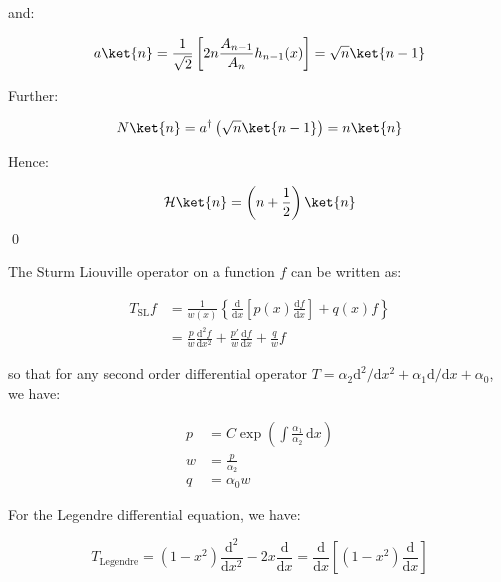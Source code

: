 \documentclass[12pt]{article}
\begin{document}
and:

\begin{equation}
    a \ket{n} = \frac{1}{\sqrt{2}} \left[ 2n \frac{A_{n-1}}{A_{n}} h_{n-1}(x) \right] = \sqrt{n} \ket{n-1}
\end{equation}

Further:

\begin{equation}
    N \ket{n} = a^{\dagger} \left( \sqrt{n} \ket{n-1} \right) = n \ket{n}
\end{equation}

Hence:

\begin{equation}
    \mathcal{H} \ket{n} = \left( n + \frac{1}{2} \right) \ket{n}
\end{equation}
\qed



The Sturm Liouville operator on a function $f$ can be written as:

\begin{equation}
\begin{split}
    T_{\text{SL}} f &= \frac{1}{w(x)} \left\{ \frac{\mathrm{d}}{\mathrm{d}x} \left[ p(x) \frac{\mathrm{d}f}{\mathrm{d}x} \right] + q(x) f \right\} \\
    &= \frac{p}{w} \frac{\mathrm{d}^{2}f}{\mathrm{d}x^{2}} + \frac{p'}{w} \frac{\mathrm{d}f}{\mathrm{d}x} + \frac{q}{w} f
\end{split}
\end{equation}

so that for any second order differential operator $T = \alpha_{2} \mathrm{d}^{2}/\mathrm{d}x^{2} + \alpha_{1} \mathrm{d}/\mathrm{d}x + \alpha_{0}$, we have:

\begin{equation}
\begin{split}
    p &= C \exp \left( \int \frac{\alpha_{1}}{\alpha_{2}} \, \mathrm{d}x \right) \\
    w &= \frac{p}{\alpha_{2}} \\
    q &= \alpha_{0} w
\end{split}
\end{equation}

For the Legendre differential equation, we have:

\begin{equation}
    T_{\text{Legendre}} = (1 - x^{2}) \frac{\mathrm{d}^{2}}{\mathrm{d}x^{2}} - 2x \frac{\mathrm{d}}{\mathrm{d}x} = \frac{\mathrm{d}}{\mathrm{d}x} \left[ (1 - x^{2}) \frac{\mathrm{d}}{\mathrm{d}x} \right]
\end{equation}
\end{document}
